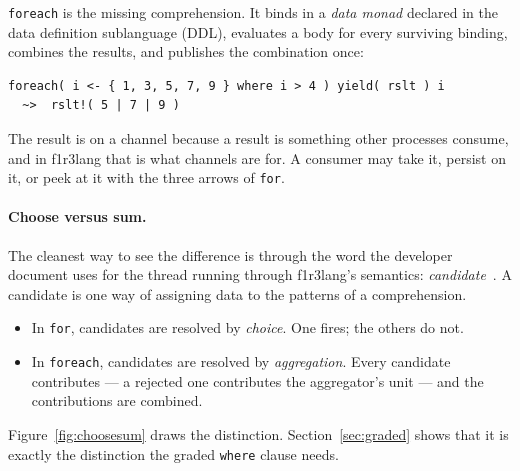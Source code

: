 \documentclass[11pt]{article}
\theoremstyle{branddef}
\theoremstyle{brandplain}
\theoremstyle{brandrem}
\newcommand{\fe}{\texttt{foreach}}
\newcommand{\flang}{\textsf{f1r3lang}}
\begin{document}
\fe{} is the missing comprehension. It binds in a \emph{data monad} declared in
the data definition sublanguage (DDL), evaluates a body for every surviving
binding, combines the results, and publishes the combination once:
\begin{lstlisting}
foreach( i <- { 1, 3, 5, 7, 9 } where i > 4 ) yield( rslt ) i
  ~>  rslt!( 5 | 7 | 9 )
\end{lstlisting}
The result is on a channel because a result is something other processes
consume, and in \flang{} that is what channels are for. A consumer may take it,
persist on it, or peek at it with the three arrows of \texttt{for}.

\paragraph{Choose versus sum.} The cleanest way to see the difference is through
the word the developer document uses for the thread running through
\flang{}'s semantics: \emph{candidate}~\cite{F1R3Dev}. A candidate is one way
of assigning data to the patterns of a comprehension.
\begin{itemize}[nosep]
\item In \texttt{for}, candidates are resolved by \emph{choice}. One fires; the
others do not.
\item In \fe{}, candidates are resolved by \emph{aggregation}. Every candidate
contributes --- a rejected one contributes the aggregator's unit --- and the
contributions are combined.
\end{itemize}
Figure~\ref{fig:choosesum} draws the distinction. Section~\ref{sec:graded}
shows that it is exactly the distinction the graded \texttt{where} clause needs.
\end{document}
